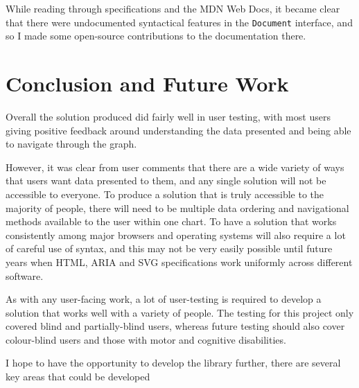 \documentclass[ %
                    author={Aleena Baig},
                supervisor={Dr Simon Lock},
                    degree={BSc},
                     title={On Making Web Accessible Graphs},
                  subtitle={},
                      year={2019} ]{dissertation}
\begin{document}
While reading through specifications and the MDN Web Docs, it became clear that there were undocumented syntactical features in the \texttt{Document} interface, and so I made some open-source contributions to the documentation there.




\chapter{Conclusion and Future Work}

Overall the solution produced did fairly well in user testing, with most users giving positive feedback around understanding the data presented and being able to navigate through the graph.

However, it was clear from user comments that there are a wide variety of ways that users want data presented to them, and any single solution will not be accessible to everyone. To produce a solution that is truly accessible to the majority of people, there will need to be multiple data ordering and navigational methods available to the user within one chart. To have a solution that works consistently among major browsers and operating systems will also require a lot of careful use of syntax, and this may not be very easily possible until future years when HTML, ARIA and SVG specifications work uniformly across different software.

As with any user-facing work, a lot of user-testing is required to develop a solution that works well with a variety of people. The testing for this project only covered blind and partially-blind users, whereas future testing should also cover colour-blind users and those with motor and cognitive disabilities.

I hope to have the opportunity to develop the library further, there are several key areas that could be developed
\end{document}
